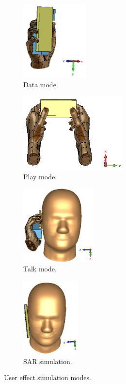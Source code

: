\begin{figure}[htbp]
    \centering
    \begin{subfigure}[b]{0.24\linewidth}
        \centering
        \includegraphics[width=\linewidth, height=4cm, keepaspectratio]{img/tech_sol/usereff_intro/usereff_onehand}
        \caption{Data mode.}
        \label{fig:usereff_onehand}
    \end{subfigure}
    \hfill
    \begin{subfigure}[b]{0.24\linewidth}
        \centering
        \includegraphics[width=\linewidth, height=4cm, keepaspectratio]{img/tech_sol/usereff_intro/usereff_twohand}
        \caption{Play mode.}
        \label{fig:usereff_twohand}
    \end{subfigure}
    \hfill
    \begin{subfigure}[b]{0.24\linewidth}
        \centering
        \includegraphics[width=\linewidth, height=4cm, keepaspectratio]{img/tech_sol/usereff_intro/usereff_headhand}
        \caption{Talk mode.}
        \label{fig:usereff_headhand}
    \end{subfigure}
    \hfill
    \begin{subfigure}[b]{0.24\linewidth}
        \centering
        \includegraphics[width=\linewidth, height=4cm, keepaspectratio]{img/tech_sol/usereff_intro/usereff_sar}
        \caption{SAR simulation.}
        \label{fig:usereff_sar}
    \end{subfigure}
    \caption{User effect simulation modes.}
    \label{fig:usereff_intro}
\end{figure}
